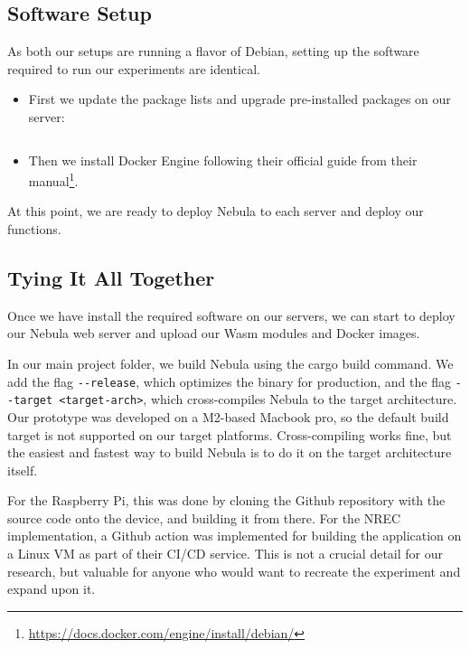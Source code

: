\documentclass[
  table]{report}
\providecommand{\tightlist}{%
  \setlength{\itemsep}{0pt}\setlength{\parskip}{0pt}}
\begin{document}
\subsection{Software Setup}

As both our setups are running a flavor of Debian, setting up the
software required to run our experiments are identical.

\begin{itemize}
\tightlist
\item
  First we update the package lists and upgrade pre-installed packages
  on our server:
\end{itemize}

\inputminted[firstline=12, lastline=13]{shell}{assets/code/commands.sh}

\begin{itemize}
\tightlist
\item
  Then we install Docker Engine following their official guide from
  their manual\footnote{\url{https://docs.docker.com/engine/install/debian/}}.
\end{itemize}

At this point, we are ready to deploy Nebula to each server and deploy
our functions.

\subsection{Tying It All Together}

Once we have install the required software on our servers, we can start
to deploy our Nebula web server and upload our \ac{Wasm} modules and
Docker images.

In our main project folder, we build Nebula using the cargo build
command. We add the flag \texttt{-\/-release}, which optimizes the
binary for production, and the flag
\texttt{-\/-target\ \textless{}target-arch\textgreater{}}, which
cross-compiles Nebula to the target architecture. Our prototype was
developed on a M2-based Macbook pro, so the default build target is not
supported on our target platforms. Cross-compiling works fine, but the
easiest and fastest way to build Nebula is to do it on the target
architecture itself.

For the Raspberry Pi, this was done by cloning the Github repository
with the source code onto the device, and building it from there. For
the \ac{NREC} implementation, a Github action was implemented for
building the application on a Linux VM as part of their CI/CD service.
This is not a crucial detail for our research, but valuable for anyone
who would want to recreate the experiment and expand upon it.
\end{document}
